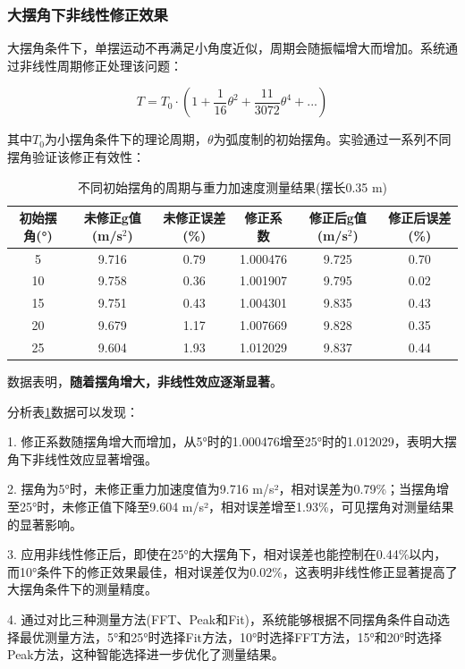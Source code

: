 \subsubsection{大摆角下非线性修正效果}

大摆角条件下，单摆运动不再满足小角度近似，周期会随振幅增大而增加。系统通过非线性周期修正处理该问题：

\begin{equation}
T = T_0 \cdot (1 + \frac{1}{16}\theta^2 + \frac{11}{3072}\theta^4 + ...)
\end{equation}

其中$T_0$为小摆角条件下的理论周期，$\theta$为弧度制的初始摆角。实验通过一系列不同摆角验证该修正有效性：

\begin{table}[H]
\centering
\caption{不同初始摆角的周期与重力加速度测量结果(摆长0.35 m)}
\begin{tabular}{@{}cccccc@{}}
\toprule
\textbf{初始摆角(°)} & \textbf{未修正g值(m/s$^2$)} & \textbf{未修正误差(\%)} & \textbf{修正系数} & \textbf{修正后g值(m/s$^2$)} & \textbf{修正后误差(\%)} \\
\midrule
5 & 9.716 & 0.79 & 1.000476 & 9.725 & 0.70 \\
10 & 9.758 & 0.36 & 1.001907 & 9.795 & 0.02 \\
15 & 9.751 & 0.43 & 1.004301 & 9.835 & 0.43 \\
20 & 9.679 & 1.17 & 1.007669 & 9.828 & 0.35 \\
25 & 9.604 & 1.93 & 1.012029 & 9.837 & 0.44 \\
\bottomrule
\end{tabular}
\label{tab:angle_periods}
\end{table}

数据表明，\textbf{随着摆角增大，非线性效应逐渐显著}。

\begin{SecondaryBox}[大摆角修正效果分析]
分析表\ref{tab:angle_periods}数据可以发现：

1. 修正系数随摆角增大而增加，从5°时的1.000476增至25°时的1.012029，表明大摆角下非线性效应显著增强。

2. 摆角为5°时，未修正重力加速度值为9.716 m/s²，相对误差为0.79\%；当摆角增至25°时，未修正值下降至9.604 m/s²，相对误差增至1.93\%，可见摆角对测量结果的显著影响。

3. 应用非线性修正后，即使在25°的大摆角下，相对误差也能控制在0.44\%以内，而10°条件下的修正效果最佳，相对误差仅为0.02\%，这表明非线性修正显著提高了大摆角条件下的测量精度。

4. 通过对比三种测量方法(FFT、Peak和Fit)，系统能够根据不同摆角条件自动选择最优测量方法，5°和25°时选择Fit方法，10°时选择FFT方法，15°和20°时选择Peak方法，这种智能选择进一步优化了测量结果。
\end{SecondaryBox}

